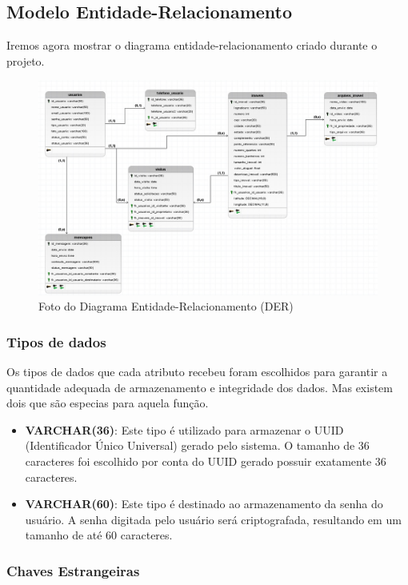 \subsection{Modelo Entidade-Relacionamento}

Iremos agora mostrar o diagrama entidade-relacionamento criado durante o projeto.
\newpage
\begin{figure}[h!] 
    \centering
    \includegraphics[width=\textwidth]{./img/Logico.jpeg}
    \caption{Foto do Diagrama Entidade-Relacionamento (DER)}
    \label{fig:exemplo-imagem}
\end{figure}
\subsubsection{Tipos de dados}

Os tipos de dados que cada atributo recebeu foram escolhidos para garantir a quantidade adequada de armazenamento e integridade dos dados. Mas existem dois que são especias para aquela função.

\begin{itemize} 
    \item \textbf{VARCHAR(36)}: Este tipo é utilizado para armazenar o UUID (Identificador Único Universal) gerado pelo sistema. O tamanho de 36 caracteres foi escolhido por conta do UUID gerado possuir exatamente 36 caracteres.
    \item \textbf{VARCHAR(60)}: Este tipo é destinado ao armazenamento da senha do usuário. A senha digitada pelo usuário será criptografada, resultando em um tamanho de até 60 caracteres. 


\end{itemize}


\subsubsection{Chaves Estrangeiras}


